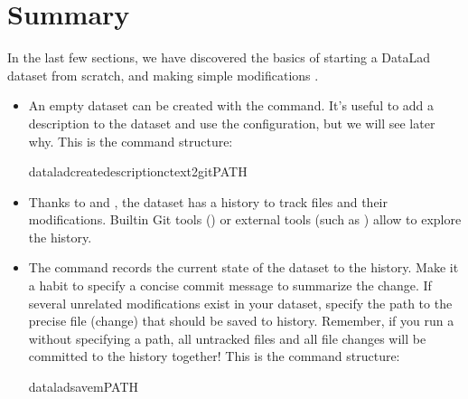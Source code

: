 \section{Summary}
\label{\detokenize{basics/101-107-summary:summary}}\label{\detokenize{basics/101-107-summary::doc}}
\sphinxAtStartPar
In the last few sections, we have discovered the basics of starting a DataLad dataset from scratch,
and making simple modifications .
\begin{itemize}
\item {} 
\sphinxAtStartPar
An empty dataset can be created with the  command. It’s useful to add a description
to the dataset and use the  configuration, but we will see later why.
This is the command structure:

\begin{sphinxVerbatim}[commandchars=\\\{\}]
dataladcreate\PYGZhy{}\PYGZhy{}description\PYGZhy{}ctext2gitPATH
\end{sphinxVerbatim}

\item {} 
\sphinxAtStartPar
Thanks to {\hyperref[\detokenize{glossary:term-Git}]{}} and {\hyperref[\detokenize{glossary:term-git-annex}]{}}, the dataset has a history to track files and their
modifications. Built\sphinxhyphen{}in Git tools () or external tools (such as ) allow to explore
the history.

\item {} 
\sphinxAtStartPar
The  command records the current state of the dataset to the history. Make it a habit
to specify a concise commit message to summarize the change. If several unrelated modifications
exist in your dataset, specify the path to the precise file (change) that should be saved to history.
Remember, if you run a  without
specifying a path, all untracked files and all file changes will be committed to the history together!
This is the command structure:

\begin{sphinxVerbatim}[commandchars=\\\{\}]
dataladsave\PYGZhy{}m\PYG{o}{[}PATH\PYG{o}{]}
\end{sphinxVerbatim}


\end{itemize}
